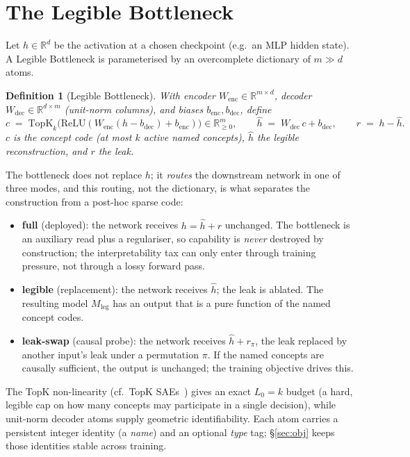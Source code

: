 \documentclass[11pt]{article}
\newtheorem{definition}{Definition}
\begin{document}
\section{The Legible Bottleneck}
\label{sec:lb}
Let $h\in\mathbb{R}^{d}$ be the activation at a chosen checkpoint (e.g.\ an MLP hidden
state). A Legible Bottleneck is parameterised by an overcomplete dictionary of
$m\gg d$ atoms.

\begin{definition}[Legible Bottleneck]
With encoder $W_{\mathrm{enc}}\in\mathbb{R}^{m\times d}$, decoder
$W_{\mathrm{dec}}\in\mathbb{R}^{d\times m}$ (unit-norm columns), and biases
$b_{\mathrm{enc}},b_{\mathrm{dec}}$, define
\[
c \;=\; \mathrm{TopK}_k\!\big(\mathrm{ReLU}(W_{\mathrm{enc}}(h-b_{\mathrm{dec}})+b_{\mathrm{enc}})\big)\in\mathbb{R}_{\ge0}^{m},
\qquad
\hat h \;=\; W_{\mathrm{dec}}\,c + b_{\mathrm{dec}},
\qquad
r \;=\; h-\hat h .
\]
$c$ is the \emph{concept code} (at most $k$ active named concepts), $\hat h$ the
\emph{legible reconstruction}, and $r$ the \emph{leak}.
\end{definition}

The bottleneck does not replace $h$; it \emph{routes} the downstream network in one of
three modes, and this routing, not the dictionary, is what separates the construction
from a post-hoc sparse code:
\begin{itemize}[leftmargin=1.4em,itemsep=1pt]
\item \textbf{full} (deployed): the network receives $h=\hat h+r$ unchanged. The
bottleneck is an auxiliary read plus a regulariser, so capability is \emph{never}
destroyed by construction; the interpretability tax can only enter through training
pressure, not through a lossy forward pass.
\item \textbf{legible} (replacement): the network receives $\hat h$; the leak is
ablated. The resulting model $M_{\mathrm{leg}}$ has an output that is a pure function of
the named concept codes.
\item \textbf{leak-swap} (causal probe): the network receives $\hat h + r_{\pi}$, the
leak replaced by another input's leak under a permutation $\pi$. If the named concepts
are causally sufficient, the output is unchanged; the training objective drives this.
\end{itemize}

The TopK non-linearity (cf.\ TopK SAEs~\citep{gao2024scaling}) gives an exact
$L_0=k$ budget (a hard, legible cap on how many concepts may participate in a single
decision), while unit-norm decoder atoms supply geometric identifiability. Each atom
carries a persistent integer identity (a \emph{name}) and an optional \emph{type} tag;
\S\ref{sec:obj} keeps those identities stable across training.
\end{document}
